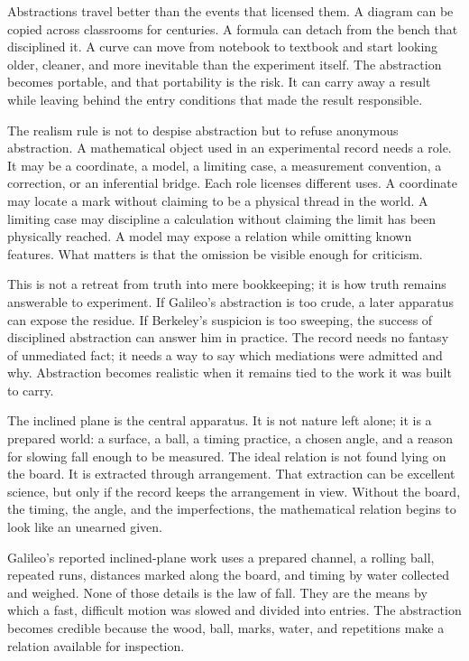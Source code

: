 Abstractions travel better than the events that licensed them. A diagram
can be copied across classrooms for centuries. A formula can detach from
the bench that disciplined it. A curve can move from notebook to textbook
and start looking older, cleaner, and more inevitable than the experiment
itself. The abstraction becomes portable, and that portability is the risk. It
can carry away a result while leaving behind the entry conditions that
made the result responsible.

The realism rule is not to despise abstraction but to refuse anonymous
abstraction. A mathematical object used in an experimental record
needs a role. It may be a coordinate, a model, a limiting case, a
measurement convention, a correction, or an inferential bridge. Each role
licenses different uses. A coordinate may locate a mark without claiming
to be a physical thread in the world. A limiting case may discipline a
calculation without claiming the limit has been physically reached. A
model may expose a relation while omitting known features. What matters is
that the omission be visible enough for criticism.

This is not a retreat from truth into mere bookkeeping; it is how truth
remains answerable to experiment. If Galileo's abstraction is too crude, a
later apparatus can expose the residue. If Berkeley's suspicion is too
sweeping, the success of disciplined abstraction can answer him in
practice. The record needs no fantasy of unmediated fact; it needs a way
to say which mediations were admitted and why. Abstraction becomes
realistic when it remains tied to the work it was built to carry.

The inclined plane is the central apparatus. It is not nature left alone;
it is a prepared world: a surface, a ball, a timing practice, a chosen
angle, and a reason for slowing fall enough to be measured. The ideal
relation is not found lying on the board. It is extracted through
arrangement. That extraction can be excellent science, but only if the
record keeps the arrangement in view. Without the board, the timing, the
angle, and the imperfections, the mathematical relation begins to look
like an unearned given.

Galileo's reported inclined-plane work uses a prepared channel, a rolling
ball, repeated runs, distances marked along the board, and timing by water
collected and weighed. None of those details is the law of fall. They are
the means by which a fast, difficult motion was slowed and divided into
entries. The abstraction becomes credible because the wood, ball, marks,
water, and repetitions make a relation available for inspection.

